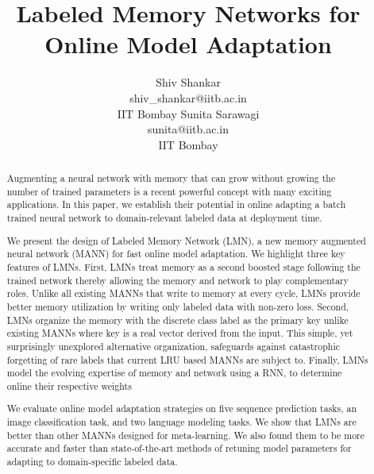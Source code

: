 \documentclass[letterpaper]{article} %
\begin{document}
%
\title{Labeled Memory Networks for Online Model Adaptation}
\author{Shiv Shankar\\
shiv\_shankar@iitb.ac.in\\
IIT Bombay
\And
Sunita Sarawagi\\
sunita@iitb.ac.in\\
IIT Bombay
}

\maketitle
\begin{abstract}
Augmenting a neural network with memory that can grow without growing the number of trained parameters is a recent powerful concept with many exciting applications.  In this paper, we establish their potential in online adapting a batch trained neural network to  domain-relevant labeled data at deployment time.


We present the design of Labeled Memory Network (LMN), a new  memory augmented neural network (MANN) for fast online model adaptation.  We highlight three key features of LMNs.
First, LMNs treat memory as a second boosted stage following the trained network thereby allowing the memory and network to play complementary roles.  Unlike all existing MANNs that write to memory at every cycle, LMNs provide better memory utilization by writing only labeled data with non-zero loss.
Second, LMNs organize the memory with the discrete class label as the primary key unlike existing MANNs where key is a real vector derived from the input. This simple, yet surprisingly unexplored alternative organization, safeguards against catastrophic forgetting of rare labels that current LRU based MANNs are subject to. Finally, LMNs  model the evolving expertise of memory and network using a RNN, to determine online their respective weights

We evaluate online model adaptation strategies on five sequence prediction tasks, an image classification task, and two language modeling tasks. We show that LMNs are better than other MANNs designed for meta-learning. We also found them to be more accurate and faster than state-of-the-art methods of retuning model parameters for adapting to domain-specific labeled data.
\end{abstract}
\end{document}

